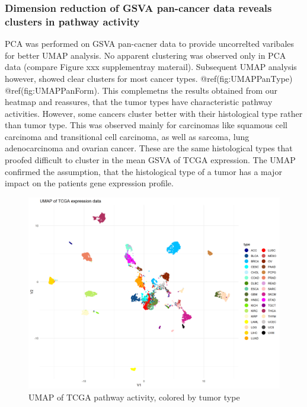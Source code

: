 \documentclass[
]{article}
\begin{document}
\hypertarget{dimension-reduction-of-gsva-pan-cancer-data-reveals-clusters-in-pathway-activity}{%
\subsubsection{Dimension reduction of GSVA pan-cancer data reveals
clusters in pathway
activity}\label{dimension-reduction-of-gsva-pan-cancer-data-reveals-clusters-in-pathway-activity}}

PCA was performed on GSVA pan-cacner data to provide uncorrelted
varibales for better UMAP analysis. No apparent clustering was observed
only in PCA data (compare Figure xxx supplementray materail). Subsequent
UMAP analysis however, showed clear clusters for most cancer types.
@ref(fig:UMAPPanType) @ref(fig:UMAPPanForm). This complemetns the
results obtained from our heatmap and reassures, that the tumor types
have characteristic pathway activities. However, some cancers cluster
better with their histological type rather than tumor type. This was
observed mainly for carcinomas like squamous cell carcinoma and
transitional cell carcinoma, as well as sarcoma, lung adenocarcinoma and
ovarian cancer. These are the same histological types that proofed
difficult to cluster in the mean GSVA of TCGA expression. The UMAP
confirmed the assumption, that the histological type of a tumor has a
major impact on the patients gene expression profile.

\begin{figure}

{\centering \includegraphics[width=0.8\linewidth]{figures/Pan Cancer UMAP} 

}

\caption{UMAP of TCGA pathway activity, colored by tumor type}\label{fig:UMAPPanType}
\end{figure}
\end{document}

